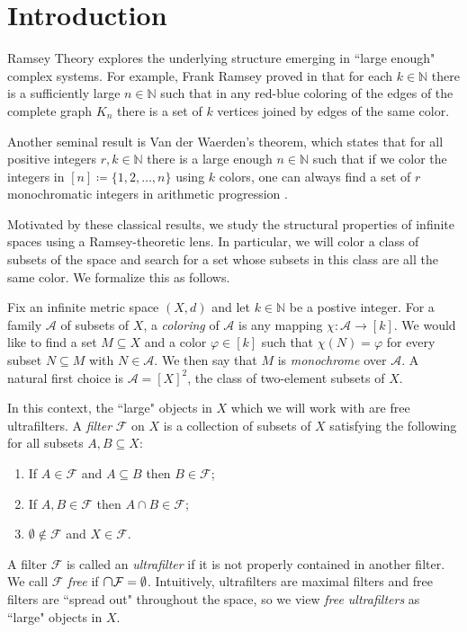 \section{Introduction}
Ramsey Theory explores the underlying structure emerging in ``large enough" complex systems. For example, Frank Ramsey proved in \cite{ramsey:1930} that for each \( k \in \mathbb{N}  \) there is a sufficiently large \( n \in \mathbb{N}  \) such that in any red-blue coloring of the edges of the complete graph \( K_{n} \) there is a set of \( k \) vertices joined by edges of the same color.

Another seminal result is Van der Waerden's theorem, which states that for all positive integers \( r, k \in \mathbb{N}  \) there is a large enough \( n \in \mathbb{N}  \) such that if we color the integers in \( [n] \coloneqq \{ 1,2,\hdots ,n \}  \) using \( k \) colors, one can always find a set of \( r \) monochromatic integers in arithmetic progression \cite{waerden:1927}.

Motivated by these classical results, we study the structural properties of infinite spaces using a Ramsey-theoretic lens. In particular, we will color a class of subsets of the space and search for a set whose subsets in this class are all the same color. We formalize this as follows.

Fix an infinite metric space \( (X,d) \) and let \( k \in \mathbb{N}  \) be a postive integer. For a family \( \mathcal{A} \) of subsets of \( X \), a \emph{coloring} of \( \mathcal{A}  \) is any mapping \( \chi : \mathcal{A} \to [k] \). We would like to find a set \( M \subseteq X \) and a color \( \varphi  \in [k] \) such that \( \chi(N) = \varphi  \) for every subset \( N \subseteq M \) with \(N \in \mathcal{A}  \). We then say that \( M \) is \emph{monochrome} over \( \mathcal{A}  \). A natural first choice is \( \mathcal{A} = [X]^{2}  \), the class of two-element subsets of \( X \).

In this context, the ``large" objects in \( X \) which we will work with are free ultrafilters. A \emph{filter} \( \mathcal{F}  \) on \( X \) is a collection of subsets of \( X \) satisfying the following for all subsets \( A, B \subseteq X \):
\begin{enumerate}[leftmargin=1.2cm]
	
	\item If \( A \in \mathcal{F} \) and \( A \subseteq B \) then \( B \in \mathcal{F}  \);
	\item If \( A, B \in \mathcal{F}  \) then \( A \cap B \in \mathcal{F}  \);
	\item \( \emptyset  \notin \mathcal{F}  \) and \( X \in \mathcal{F}  \).
\end{enumerate}
A filter \( \mathcal{F}  \) is called an \emph{ultrafilter} if it is not properly contained in another filter. We call \( \mathcal{F}  \) \emph{free} if \( \medcap \mathcal{F} = \emptyset  \). Intuitively, ultrafilters are maximal filters and free filters are ``spread out" throughout the space, so we view \emph{free ultrafilters} as ``large" objects in \( X \).


